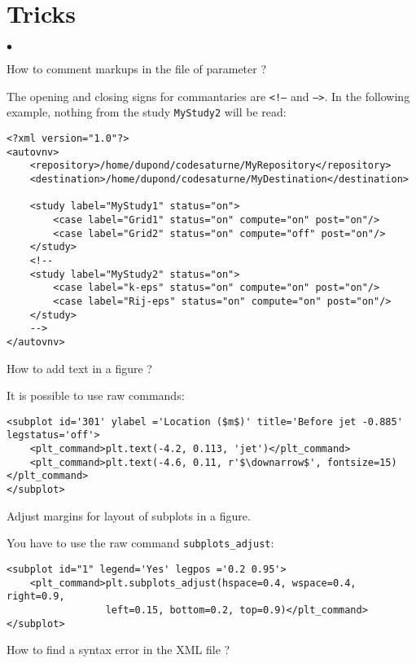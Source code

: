 \documentclass[a4paper,10pt,twoside]{csshortdoc}
\begin{document}
\section{Tricks}\label{sec:tricks}
\begin{list}{$\bullet$}{}
\item How to comment markups in the file of parameter ?

The opening and closing signs for commantaries are \texttt{<!--} and
\texttt{-->}. In the following example, nothing from the study
\texttt{MyStudy2} will be read:
\small
\begin{verbatim}
<?xml version="1.0"?>
<autovnv>
    <repository>/home/dupond/codesaturne/MyRepository</repository>
    <destination>/home/dupond/codesaturne/MyDestination</destination>

    <study label="MyStudy1" status="on">
        <case label="Grid1" status="on" compute="on" post="on"/>
        <case label="Grid2" status="on" compute="off" post="on"/>
    </study>
    <!--
    <study label="MyStudy2" status="on">
        <case label="k-eps" status="on" compute="on" post="on"/>
        <case label="Rij-eps" status="on" compute="on" post="on"/>
    </study>
    -->
</autovnv>
\end{verbatim}
\normalsize

\item How to add text in a figure ?

It is possible to use raw commands:
\small
\begin{verbatim}
<subplot id='301' ylabel ='Location ($m$)' title='Before jet -0.885' legstatus='off'>
    <plt_command>plt.text(-4.2, 0.113, 'jet')</plt_command>
    <plt_command>plt.text(-4.6, 0.11, r'$\downarrow$', fontsize=15)</plt_command>
</subplot>
 \end{verbatim}
\normalsize

\item Adjust margins for layout of subplots in a figure.

You have to use the raw command \texttt{subplots\_adjust}:

\small
\begin{verbatim}
<subplot id="1" legend='Yes' legpos ='0.2 0.95'>
    <plt_command>plt.subplots_adjust(hspace=0.4, wspace=0.4, right=0.9,
                 left=0.15, bottom=0.2, top=0.9)</plt_command>
</subplot>
\end{verbatim}
\normalsize

\item How to find a syntax error in the XML file ?


\end{list}
\end{document}
